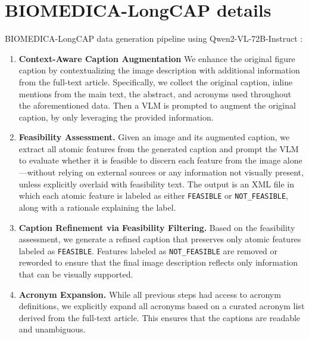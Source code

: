 \appendix




\newpage
\section{BIOMEDICA-LongCAP details}\label{apd:longcap}


BIOMEDICA-LongCAP data generation pipeline using Qwen2-VL-72B-Instruct \cite{qwen2vl}:

\begin{enumerate}
    \item {\bf Context-Aware Caption Augmentation} We enhance the original figure caption by contextualizing the image description with additional information from the full-text article. Specifically, we collect the original caption, inline mentions from the main text, the abstract, and acronyms used throughout the aforementioned data. Then a VLM is prompted to augment the original caption, by only leveraging the provided information.
    
    \item {\bf Feasibility Assessment.} Given an image and its augmented caption, we extract all atomic features from the generated caption and prompt the VLM to evaluate whether it is feasible to discern each feature from the image alone—without relying on external sources or any information not visually present, unless explicitly overlaid with feasibility text. The output is an XML file in which each atomic feature is labeled as either \texttt{FEASIBLE} or \texttt{NOT\_FEASIBLE}, along with a rationale explaining the label.

    \item {\bf Caption Refinement via Feasibility Filtering.} Based on the feasibility assessment, we generate a refined caption that preserves only atomic features labeled as \texttt{FEASIBLE}. Features labeled as \texttt{NOT\_FEASIBLE} are removed or reworded to ensure that the final image description reflects only information that can be visually supported.
    
    \item {\bf Acronym Expansion.} While all previous steps had access to acronym definitions, we explicitly expand all acronyms based on a curated acronym list derived from the full-text article. This ensures that the captions are readable and unambiguous.
    
\end{enumerate}

